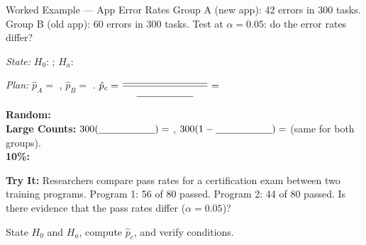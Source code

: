 \documentclass[10pt]{article}
\begin{document}
\begin{notesbox}{Worked Example --- App Error Rates}
Group A (new app): 42 errors in 300 tasks. Group B (old app): 60 errors in 300 tasks.
Test at $\alpha=0.05$: do the error rates differ?

\textit{State:} $H_0$: \blank{6cm}; $H_a$: \blank{6cm}

\textit{Plan:} $\hat p_A = $ \blank{2cm}, $\hat p_B = $ \blank{2cm}. \quad
$\hat p_c = \dfrac{\blank{3cm}}{\blank{2cm}} = $ \blank{2cm}

\textbf{Random:} \blank{6cm} \\
\textbf{Large Counts:} $300(\blank{2cm}) = $ \blank{2cm}, $300(1-\blank{2cm}) = $ \blank{2cm} \quad (same for both groups).\\
\textbf{10\%:} \blank{6cm}
\end{notesbox}

\begin{practicebox}
\textbf{Try It:} Researchers compare pass rates for a certification exam between two training
programs. Program 1: 56 of 80 passed. Program 2: 44 of 80 passed.
Is there evidence that the pass rates differ ($\alpha=0.05$)?

State $H_0$ and $H_a$, compute $\hat p_c$, and verify conditions.
\end{practicebox}
\end{document}

